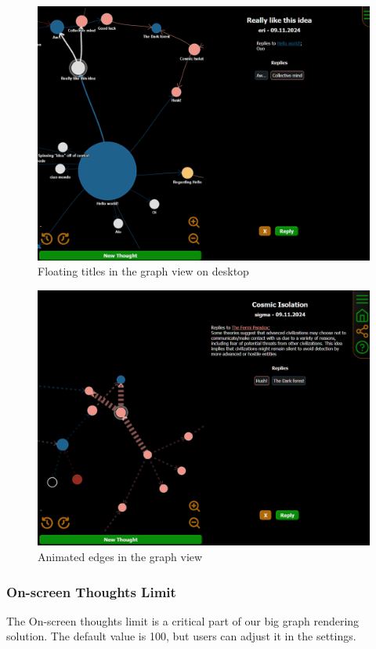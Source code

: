 \begin{figure}[p]
    \includegraphics[width=130mm, keepaspectratio]{img/afantazie_floating_titles.png}
    \caption{Floating titles in the graph view on desktop}
    \label{obr:afantazie_floating_titles}
\end{figure}

\begin{figure}[p]
    \includegraphics[width=130mm, keepaspectratio]{img/afantazie_animated_edges.png}
    \caption{Animated edges in the graph view}
    \label{obr:afantazie_animated_edges}
\end{figure}

\subsubsection*{On-screen Thoughts Limit}
The On-screen thoughts limit is a critical part of our big graph rendering solution.
The default value is 100, but users can adjust it in the settings.


